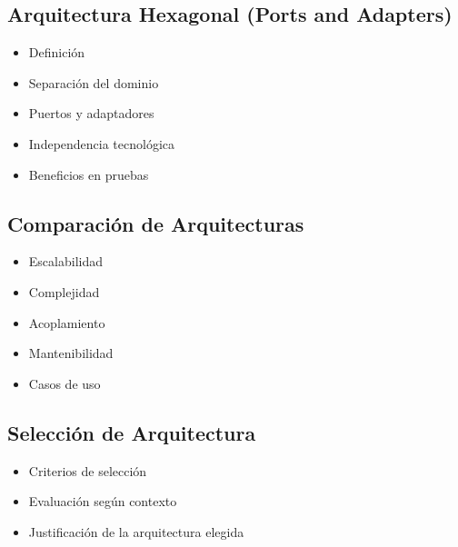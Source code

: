 \subsection{Arquitectura Hexagonal (Ports and Adapters)}
\begin{itemize}
    \item Definición
    \item Separación del dominio
    \item Puertos y adaptadores
    \item Independencia tecnológica
    \item Beneficios en pruebas
\end{itemize}

\subsection{Comparación de Arquitecturas}
\begin{itemize}
    \item Escalabilidad
    \item Complejidad
    \item Acoplamiento
    \item Mantenibilidad
    \item Casos de uso
\end{itemize}

\subsection{Selección de Arquitectura}
\begin{itemize}
    \item Criterios de selección
    \item Evaluación según contexto
    \item Justificación de la arquitectura elegida
\end{itemize}